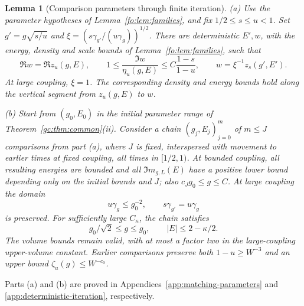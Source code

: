 \documentclass[11pt]{article}
\numberwithin{equation}{section}
\newtheorem{lemma}[theorem]{Lemma}
\theoremstyle{remark}
\begin{document}
\begin{lemma}[Comparison parameters through finite iteration]\label{da:lem:comparison-parameters}
\textup{(a)} Use the parameter hypotheses of Lemma~\ref{fo:lem:families}, and fix
$1/2\le s\le u<1$. Set $g'=g\sqrt{s/u}$ and
$\xi=(s\gamma_{g'}/(u\gamma_g))^{1/2}$. There are deterministic $E',w$,
with the energy, density and scale bounds of Lemma~\ref{fo:lem:families}, such that
\begin{equation}\label{da:eq:comparison-parameters}
 \Re w=\Re z_u(g,E),\qquad
 1\le\frac{\Im w}{\eta_u(g,E)}\le C\frac{1-s}{1-u},\qquad
 w=\xi^{-1}z_s(g',E').
\end{equation}
At large coupling, $\xi=1$. The corresponding density and energy bounds
hold along the vertical segment from $z_u(g,E)$ to $w$.

\textup{(b)} Start from $(g_0,E_0)$ in the initial parameter range of
Theorem~\ref{gc:thm:common}(ii). Consider a chain $(g_j,E_j)_{j=0}^m$ of $m\le J$ comparisons from
part \textup{(a)}, where $J$ is fixed, interspersed with movement to
earlier times at fixed coupling, all times in $[1/2,1)$.
At bounded coupling, all resulting energies are bounded and all
$\Im m_{g,L}(E)$ have a positive lower bound depending only on the
initial bounds and $J$; also $c_Jg_0\le g\le C$.
At large coupling the domain
\begin{equation}\label{fo:eq:large-time-domain}
 u\gamma_g\le g_0^{-2},\qquad s\gamma_{g'}=u\gamma_g
\end{equation}
is preserved. For sufficiently large $C_\kappa$, the chain satisfies
\begin{equation}\label{fo:eq:large-input-domain}
 g_0/\sqrt2\le g\le g_0,\qquad |E|\le2-\kappa/2.
\end{equation}
The volume bounds remain valid, with at most a factor two in the
large-coupling upper-volume constant. Earlier comparisons preserve both
$1-u\ge W^{-3}$ and an upper bound $\zeta_u(g)\le W^{-c_0}$.
\end{lemma}
Parts \textup{(a)} and \textup{(b)} are proved in Appendices~\ref{app:matching-parameters} and \ref{app:deterministic-iteration}, respectively.
\end{document}

